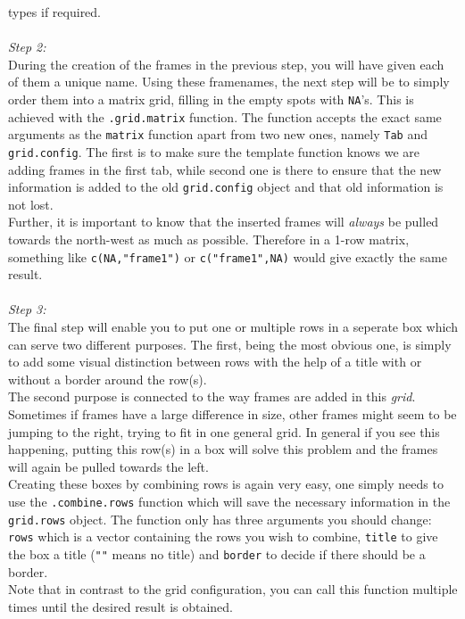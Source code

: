 \documentclass[a4paper]{article}\usepackage[]{graphicx}\usepackage[]{color}
\begin{document}
types if required.
\\ \\
{\it Step 2:}\\
During the creation of the frames in the previous step, you will have given each
of them a unique name. Using these framenames, the next step will be to simply
order them into a matrix grid, filling in the empty spots with \verb|NA|'s.
This is achieved with the \verb|.grid.matrix| function. The function accepts
the exact same arguments as the \verb|matrix| function apart from two new ones,
namely \verb|Tab| and \verb|grid.config|. The first is to make sure the
template function knows we are adding frames in the first tab, while second one
is there to ensure that the new information is added to the old
\verb|grid.config| object and that old information is not lost.\\
Further, it is important to know that the inserted frames will {\it always} be
pulled towards the north-west as much as possible. Therefore in a 1-row
matrix, something like \verb|c(NA,"frame1")| or \verb|c("frame1",NA)| would give
exactly the same result.
\\ \\
{\it Step 3:}\\
The final step will enable you to put one or multiple rows in a seperate box
which can serve two different purposes. The first, being the most obvious one, is
simply to add some visual distinction between rows with the help of a title with
or without a border around the row(s).\\
The second purpose is connected to the way frames are added in this {\it grid}.
Sometimes if frames have a large difference in size, other frames might seem to
be jumping to the right, trying to fit in one general grid. In general if you
see this happening, putting this row(s) in a box will solve this problem and the
frames will again be pulled towards the left.\\
Creating these boxes by combining rows is again very easy, one simply needs to
use the \verb|.combine.rows| function which will save the necessary information
in the \verb|grid.rows| object. The function only has three arguments you should
change: \verb|rows| which is a vector containing the rows you wish to
combine, \verb|title| to give the box a title (\verb|""| means no title) and
\verb|border| to decide if there should be a border.\\
Note that in contrast to the grid configuration, you can call this function
multiple times until the desired result is obtained.
\end{document}
